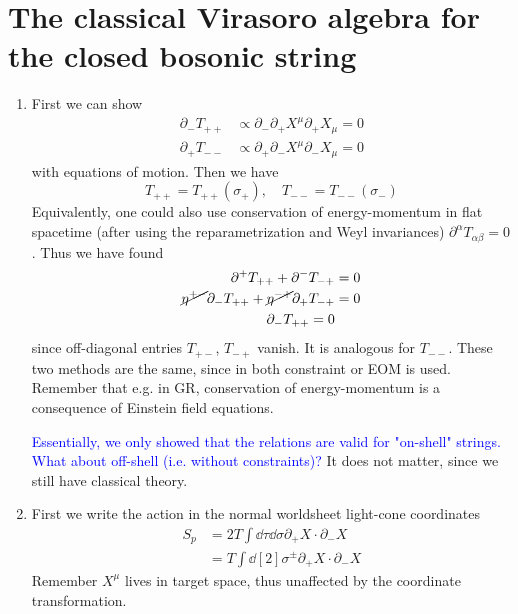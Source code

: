 \section{The classical Virasoro algebra for the closed bosonic string}

\begin{enumerate}[label=(\alph*)]
	\item 
		First we can show
		\begin{align*}
			\partial_- T_{++} &\propto \partial_- \partial_+ X^\mu \partial_+ X_\mu = 0 \\
			\partial_+ T_{--} &\propto \partial_+ \partial_- X^\mu \partial_- X_\mu = 0
		\end{align*}
		with equations of motion. Then we have
		\begin{equation}
			T_{++} = T_{++}(\sigma_+), \quad T_{--} = T_{--}(\sigma_-)
		\end{equation}
		Equivalently, one could also use conservation of energy-momentum in flat spacetime (after using the reparametrization and Weyl invariances) $\partial^\alpha T_{\alpha\beta} = 0$. Thus we have found
		\begin{align*}
			\partial^+ T_{++} + \partial^- T_{-+} &= 0 	 \\
			\cancel{\eta^{+-}}\partial_- T_{++} + \cancel{\eta^{-+}} \partial_+ T_{-+} &= 0 \\
			\partial_- T_{++} = 0
		\end{align*}
		since off-diagonal entries $T_{+-}$, $T_{-+}$ vanish. It is analogous for $T_{--}$. These two methods are the same, since in both constraint or EOM is used. Remember that e.g. in GR, conservation of energy-momentum is a consequence of Einstein field equations.
		
		\textcolor{blue}{Essentially, we only showed that the relations are valid for "on-shell" strings. What about off-shell (i.e. without constraints)?} It does not matter, since we still have classical theory.

	\item 
		First we write the action in the normal worldsheet light-cone coordinates
		\begin{align*}
			S_p &= 2 T \int \dd{\tau} \dd{\sigma} \partial_+ X \cdot \partial_- X \\
				 &= T \int \dd[2]{\sigma^{\pm}} \partial_+ X \cdot \partial_- X
		\end{align*}
		Remember $X^\mu$ lives in target space, thus unaffected by the coordinate transformation.


\end{enumerate}
